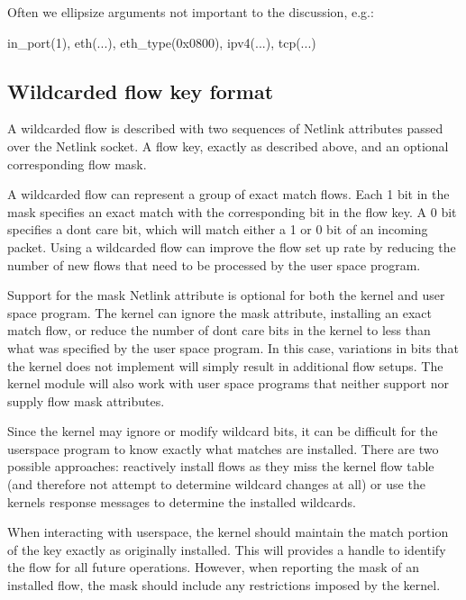 Often we ellipsize arguments not important to the discussion, e.\+g.\+: \begin{DoxyVerb}in_port(1), eth(...), eth_type(0x0800), ipv4(...), tcp(...)
\end{DoxyVerb}


\subsection*{Wildcarded flow key format }

A wildcarded flow is described with two sequences of Netlink attributes passed over the Netlink socket. A flow key, exactly as described above, and an optional corresponding flow mask.

A wildcarded flow can represent a group of exact match flows. Each \textquotesingle{}1\textquotesingle{} bit in the mask specifies an exact match with the corresponding bit in the flow key. A \textquotesingle{}0\textquotesingle{} bit specifies a don\textquotesingle{}t care bit, which will match either a \textquotesingle{}1\textquotesingle{} or \textquotesingle{}0\textquotesingle{} bit of an incoming packet. Using a wildcarded flow can improve the flow set up rate by reducing the number of new flows that need to be processed by the user space program.

Support for the mask Netlink attribute is optional for both the kernel and user space program. The kernel can ignore the mask attribute, installing an exact match flow, or reduce the number of don\textquotesingle{}t care bits in the kernel to less than what was specified by the user space program. In this case, variations in bits that the kernel does not implement will simply result in additional flow setups. The kernel module will also work with user space programs that neither support nor supply flow mask attributes.

Since the kernel may ignore or modify wildcard bits, it can be difficult for the userspace program to know exactly what matches are installed. There are two possible approaches\+: reactively install flows as they miss the kernel flow table (and therefore not attempt to determine wildcard changes at all) or use the kernel\textquotesingle{}s response messages to determine the installed wildcards.

When interacting with userspace, the kernel should maintain the match portion of the key exactly as originally installed. This will provides a handle to identify the flow for all future operations. However, when reporting the mask of an installed flow, the mask should include any restrictions imposed by the kernel.


